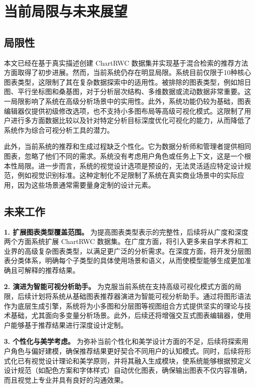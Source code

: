 \section{当前局限与未来展望}

\subsection{局限性}

本文已经在基于真实描述创建 ChartRWC 数据集并实现基于混合检索的推荐方法方面取得了初步进展。然而，当前系统仍存在明显局限。系统目前仅限于10种核心图表类型，这限制了其在复杂数据探索中的适用性。被排除的图表类型，例如旭日图、平行坐标图和桑基图，对于分析层次结构、多维数据或流动数据非常重要。这一局限影响了系统在高级分析场景中的实用性。此外，系统功能仍较为基础，图表编辑器仅提供初级修改选项，也不支持小多图布局等高级可视化模式。这限制了用户进行多方面数据比较以及针对特定分析目标深度优化可视化的能力，从而降低了系统作为综合可视分析工具的潜力。

此外，当前系统的推荐和生成过程缺乏个性化。它为数据分析师和管理者提供相同图表，忽略了他们不同的需求。系统没有考虑用户角色或任务上下文，这是一个根本性局限。进一步而言，系统的视觉设计选项是预设的，无法灵活适应特定设计规范，例如视觉识别标准。这种定制化不足限制了系统在真实商业场景中的实际应用，因为这些场景通常需要量身定制的设计元素。

\subsection{未来工作}


\textbf{1. 扩展图表类型覆盖范围。}
为提高图表类型表示的完整性，后续将从广度和深度两个方面系统扩展 ChartRWC 数据集。在广度方面，将引入更多来自学术界和工业界的高级复杂图表类型，以满足更广泛的分析需求。在深度方面，将开发分层图表分类体系，明确每个子类型的具体使用场景和语义，从而使模型能够生成更加准确且可解释的推荐结果。

\textbf{2. 演进为智能可视分析助手。}
为克服当前系统在支持高级可视化模式方面的局限，后续计划将系统从基础图表推荐器演进为智能可视分析助手。通过将图形语法作为底层生成引擎，系统将为小多图和分层图等视图组合方式提供坚实的理论与技术基础，尤其面向多变量分析场景。此外，后续还将增强交互式图表编辑器，使用户能够基于推荐结果进行深度设计定制。

\textbf{3. 个性化与美学考虑。}
为弥补当前个性化和美学设计方面的不足，后续将探索用户角色与偏好建模，确保推荐结果更好契合不同用户的认知模式。同时，后续将形式化已有视觉设计理论和美学原则，并将其融入生成模块，使系统能够根据预定义设计规范（如配色方案和字体样式）自动优化图表，确保输出图表不仅内容准确，而且视觉上专业并具有良好的沟通效果。


